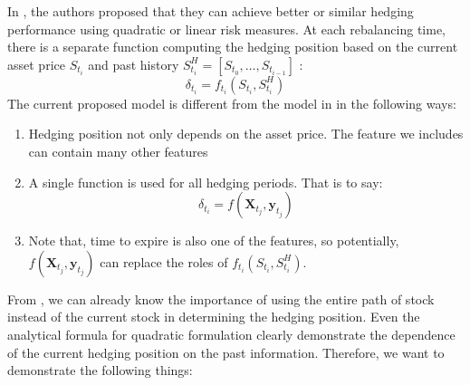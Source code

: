 \documentclass[letterpaper,12pt,titlepage,oneside,final]{book}
\numberwithin{equation}{section}
\theoremstyle{definition}
\newcommand{\vy}{\mathbf{y}}
\begin{document}
In \cite{coleman2007total}, the authors proposed that they can achieve better or similar hedging performance using quadratic or linear risk measures. At each rebalancing time, there is a separate function computing the hedging position based on the current asset price $S_{t_i}$ and past history $S^H_{t_i}=[S_{t_0},\dots,S_{t_{i-1}}]$ :
\[
\delta_{t_i}=f_{t_i}(S_{t_i},S^H_{t_i})
\]
The current proposed model is different from the model in \cite{coleman2007total} in the following ways:
\begin{enumerate}
  \item Hedging position not only depends on the asset price. The feature we includes can contain many other features
  \item A single function is used for all hedging periods.
  That is to say:
  \[
  \delta_{t_i}=f(\mathbf{X}_{t_j},\vy_{t_j})
  \]
  \item Note that, time to expire is also one of the features, so potentially, $f(\mathbf{X}_{t_j},\vy_{t_j})$ can replace the roles of $f_{t_i}(S_{t_i},S^H_{t_i})$.
\end{enumerate}

From \cite{coleman2007total}, we can already know the importance of using the entire path of stock instead of the current stock in determining the hedging position. Even the analytical formula for quadratic formulation clearly demonstrate the dependence of the current hedging position on the past information.
Therefore, we want to demonstrate the following things:
\end{document}
